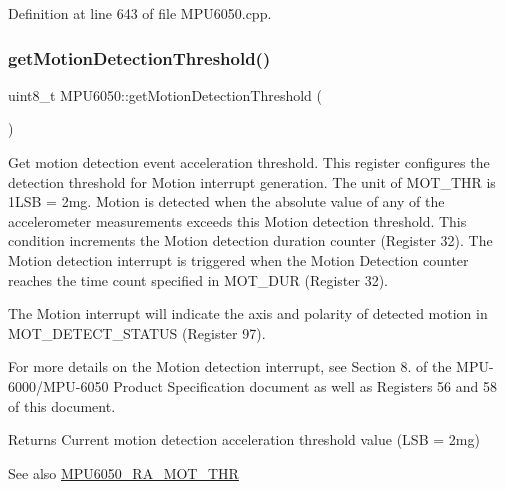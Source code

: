 Definition at line 643 of file M\+P\+U6050.\+cpp.


\begin{DoxyCode}{0}

\end{DoxyCode}
\mbox{\label{classMPU6050_ab7a825b1b8b86cebda308289630795e7}} 
\subsubsection{\texorpdfstring{getMotionDetectionThreshold()}{getMotionDetectionThreshold()}}
{\footnotesize\ttfamily uint8\+\_\+t M\+P\+U6050\+::get\+Motion\+Detection\+Threshold (\begin{DoxyParamCaption}{ }\end{DoxyParamCaption})}

Get motion detection event acceleration threshold. This register configures the detection threshold for Motion interrupt generation. The unit of M\+O\+T\+\_\+\+T\+HR is 1L\+SB = 2mg. Motion is detected when the absolute value of any of the accelerometer measurements exceeds this Motion detection threshold. This condition increments the Motion detection duration counter (Register 32). The Motion detection interrupt is triggered when the Motion Detection counter reaches the time count specified in M\+O\+T\+\_\+\+D\+UR (Register 32).

The Motion interrupt will indicate the axis and polarity of detected motion in M\+O\+T\+\_\+\+D\+E\+T\+E\+C\+T\+\_\+\+S\+T\+A\+T\+US (Register 97).

For more details on the Motion detection interrupt, see Section 8. of the M\+P\+U-\/6000/\+M\+P\+U-\/6050 Product Specification document as well as Registers 56 and 58 of this document.

\begin{DoxyReturn}{Returns}
Current motion detection acceleration threshold value (L\+SB = 2mg) 
\end{DoxyReturn}
\begin{DoxySeeAlso}{See also}
\mbox{\hyperlink{MPU6050_8h_a444c7d6d710bcc30f1ad98f703f9921e}{M\+P\+U6050\+\_\+\+R\+A\+\_\+\+M\+O\+T\+\_\+\+T\+HR}} 
\end{DoxySeeAlso}


